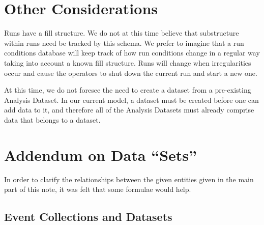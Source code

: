 \documentclass{cmspaper}
\begin{document}
\section{Other Considerations}

Runs have a fill structure.  We do not at this time believe that substructure within 
runs need be tracked by this schema.  We prefer to imagine that a run conditions 
database will keep track of how run conditions change in a regular way taking into 
account a known fill structure.  Runs will change when irregularities occur and cause 
the operators to shut down the current run and start a new one.  

At this time, we do not foresee the need to create a dataset from a 
pre-existing Analysis Dataset.  In our current model, a dataset must be created 
before one can add data to it, and therefore all of the Analysis Datasets must 
already comprise data that belongs to a dataset.  


\appendix

\section{Addendum on Data ``Sets''}\label{appendix}

In order to clarify the relationships between the given entities given in the main part of 
this note, it was felt that some formulae would help. 

\subsection{Event Collections and Datasets}
\end{document}
